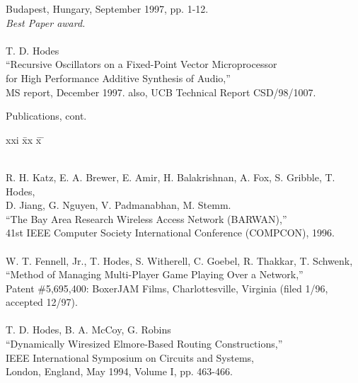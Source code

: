 \begin{tabbing}
\>\>        Budapest, Hungary, September 1997, pp. 1-12. \\
\>\>        {\em Best Paper award. }\\
\smallskip \\[-3pt]
\>    T. D. Hodes \\
\>\>      ``Recursive Oscillators on a Fixed-Point Vector Microprocessor \\
\>\>\>     for High Performance Additive Synthesis of Audio,'' \\
\>\>       MS report, December 1997. also, UCB Technical Report CSD/98/1007. \\

\end{tabbing}
\newpage
\begin{bf} \large
Publications, cont.
\end{bf}
\begin{tabbing}
xxi \= xx \= x \= \kill

\smallskip \\[-3pt]
\>    R. H. Katz, E. A. Brewer, E. Amir, H. Balakrishnan, A. Fox,
       S. Gribble, T. Hodes, \\
\>\>\>   D. Jiang, G. Nguyen, V. Padmanabhan, M. Stemm. \\
\>\> ``The Bay Area Research Wireless Access Network (BARWAN),''  \\
\>\> 41st IEEE Computer Society International Conference (COMPCON), 1996. \\
\smallskip \\
\>	W. T. Fennell, Jr., T. Hodes, S. Witherell, C. Goebel, 
	R. Thakkar, T. Schwenk, \\
\>\>	``Method of Managing Multi-Player Game Playing Over a Network,''  \\
\>\>	Patent \#5,695,400: BoxerJAM Films, Charlottesville, Virginia 
(filed 1/96, accepted 12/97).  \\
\smallskip \\
\>    T. D. Hodes, B. A. McCoy, G. Robins \\
\>\>  ``Dynamically Wiresized Elmore-Based Routing Constructions,''  \\
\> IEEE International Symposium on Circuits and Systems, \\
\>\>   London, England, May 1994, Volume I, pp. 463-466. \\
\smallskip \\
\end{tabbing}


